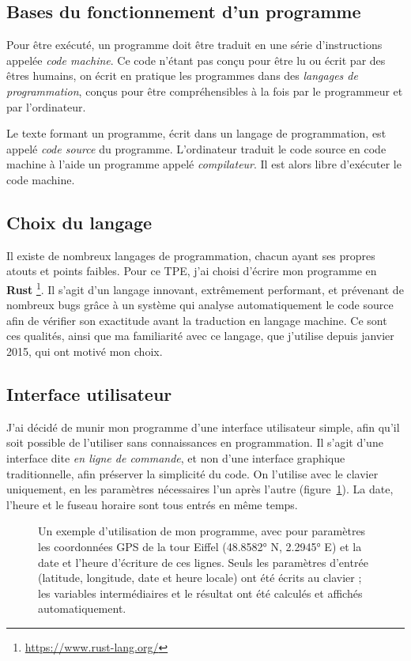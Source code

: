 \documentclass[12pt]{article}
\begin{document}
\subsection{Bases du fonctionnement d'un programme}

Pour être exécuté, un programme doit être traduit en une série d'instructions appelée \emph{code machine}.
Ce code n'étant pas conçu pour être lu ou écrit par des êtres humains, on écrit en pratique les programmes dans des \emph{langages de programmation}, conçus pour être compréhensibles à la fois par le programmeur et par l'ordinateur.

Le texte formant un programme, écrit dans un langage de programmation, est appelé \emph{code source} du programme.
L'ordinateur traduit le code source en code machine à l'aide un programme appelé \emph{compilateur}.
Il est alors libre d'exécuter le code machine.


\subsection{Choix du langage}

Il existe de nombreux langages de programmation, chacun ayant ses propres atouts et points faibles.
Pour ce TPE, j'ai choisi d'écrire mon programme en \textbf{Rust} \footnote{\url{https://www.rust-lang.org/}}.
Il s'agit d'un langage innovant, extrêmement performant, et prévenant de nombreux bugs grâce à un système qui analyse automatiquement le code source afin de vérifier son exactitude avant la traduction en langage machine.
Ce sont ces qualités, ainsi que ma familiarité avec ce langage, que j'utilise depuis janvier 2015, qui ont motivé mon choix.


\subsection{Interface utilisateur}

J'ai décidé de munir mon programme d'une interface utilisateur simple, afin qu'il soit possible de l'utiliser sans connaissances en programmation. Il s'agit d'une interface dite \emph{en ligne de commande}, et non d'une interface graphique traditionnelle, afin préserver la simplicité du code. On l'utilise avec le clavier uniquement, en les paramètres nécessaires l'un après l'autre (figure~\ref{fig:demo}). La date, l'heure et le fuseau horaire sont tous entrés en même temps.

\begin{figure}[!htbp]
  \centering
  \caption{Un exemple d'utilisation de mon programme, avec pour paramètres les coordonnées GPS de la tour Eiffel (48.8582° N, 2.2945° E) et la date et l'heure d'écriture de ces lignes. Seuls les paramètres d'entrée (latitude, longitude, date et heure locale) ont été écrits au clavier ; les variables intermédiaires et le résultat ont été calculés et affichés automatiquement.}
  \label{fig:demo}
\end{figure}
\end{document}
